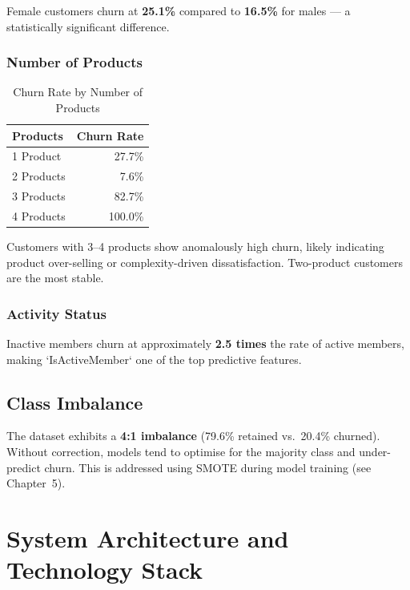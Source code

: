 \documentclass[12pt, a4paper]{report}
\begin{document}
Female customers churn at \textbf{25.1\%} compared to \textbf{16.5\%} for males --- a statistically significant difference.

\subsection{Number of Products}

\begin{table}[H]
\centering
\caption{Churn Rate by Number of Products}
\label{tab:prod_churn}
\begin{tabular}{l r}
\toprule
\textbf{Products} & \textbf{Churn Rate} \\
\midrule
1 Product & 27.7\% \\
2 Products & 7.6\% \\
3 Products & 82.7\% \\
4 Products & 100.0\% \\
\bottomrule
\end{tabular}
\end{table}

Customers with 3--4 products show anomalously high churn, likely indicating product over-selling or complexity-driven dissatisfaction. Two-product customers are the most stable.

\subsection{Activity Status}

Inactive members churn at approximately \textbf{2.5 times} the rate of active members, making `IsActiveMember` one of the top predictive features.

\section{Class Imbalance}

The dataset exhibits a \textbf{4:1 imbalance} (79.6\% retained vs.\ 20.4\% churned). Without correction, models tend to optimise for the majority class and under-predict churn. This is addressed using SMOTE during model training (see Chapter~5).


\chapter{System Architecture and Technology Stack}
\end{document}
